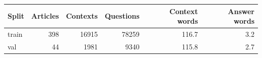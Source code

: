 \begin{tabular}{lrrrrr}
\hline
Split & Articles & Contexts & Questions & Context words & Answer words \\
\hline
train & 398 & 16915 & 78259 & 116.7 & 3.2 \\
val & 44 & 1981 & 9340 & 115.8 & 2.7 \\
\hline
\end{tabular}
